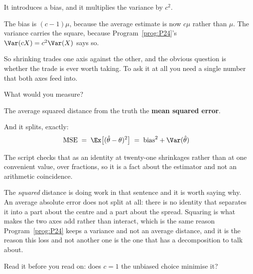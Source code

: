 \begin{fr}
\begin{ansblock}
It introduces a bias, and it multiplies the variance by $c^{2}$.
\end{ansblock}

The bias is $(c-1)\mu$, because the average estimate is now $c\mu$ rather than
$\mu$. The variance carries the square, because Program~\ref{prog:P24}'s
$\Var(cX) = c^{2}\Var(X)$ says so.

So shrinking trades one axis against the other, and the obvious question is
whether the trade is ever worth taking. To ask it at all you need a single
number that both axes feed into.

What would you measure?
\dotline
\nextframe
\end{fr}

\begin{fr}
\begin{ansblock}
The average squared distance from the truth \dash{} the
\textbf{mean squared error}.
\end{ansblock}

And it splits, exactly:
\[ \mathrm{MSE} \;=\; \Ex\bigl[(\hat\theta - \theta)^{2}\bigr]
   \;=\; \text{bias}^{2} + \Var(\hat\theta) \]

The script checks that as an identity at twenty-one shrinkages rather than at
one convenient value, over fractions, so it is a fact about the estimator and
not an arithmetic coincidence.

The \emph{squared} distance is doing work in that sentence and it is worth
saying why. An average absolute error does not split at all: there is no
identity that separates it into a part about the centre and a part about the
spread. Squaring is what makes the two axes add rather than interact, which
is the same reason Program~\ref{prog:P24} keeps a variance and not an average
distance, and it is the reason this loss and not another one is the one that
has a decomposition to talk about.

Read it before you read on: does $c = 1$ \dash{} the unbiased choice
\dash{} minimise it?
\dotline
\nextframe
\end{fr}

